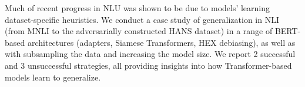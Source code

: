 Much of recent progress in NLU was shown to be due to models' learning dataset-specific heuristics. We conduct a case study of generalization in NLI (from MNLI to the adversarially constructed HANS dataset) in a range of BERT-based architectures (adapters, Siamese Transformers, HEX debiasing), as well as with subsampling the data and increasing the model size. We report 2 successful and 3 unsuccessful strategies, all providing insights into how Transformer-based models learn to generalize.
